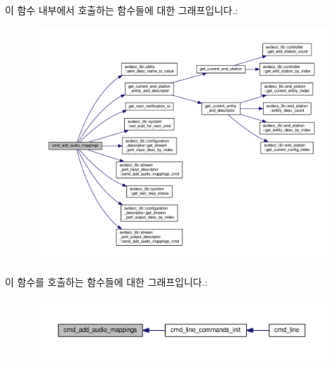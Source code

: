 이 함수 내부에서 호출하는 함수들에 대한 그래프입니다.\+:
\nopagebreak
\begin{figure}[H]
\begin{center}
\leavevmode
\includegraphics[width=350pt]{classcmd__line_aaaee251fae097155da4f2be383551c7d_cgraph}
\end{center}
\end{figure}




이 함수를 호출하는 함수들에 대한 그래프입니다.\+:
\nopagebreak
\begin{figure}[H]
\begin{center}
\leavevmode
\includegraphics[width=350pt]{classcmd__line_aaaee251fae097155da4f2be383551c7d_icgraph}
\end{center}
\end{figure}


